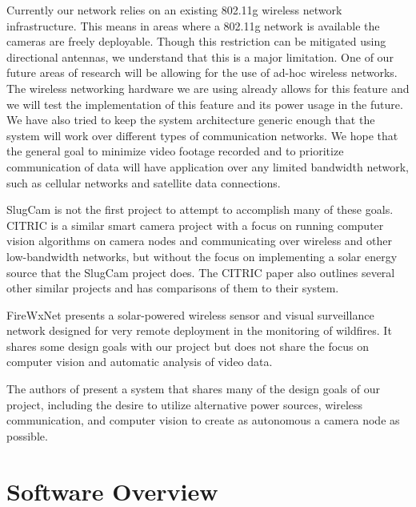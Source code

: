 Currently our network relies on an existing 802.11g wireless network
infrastructure. This means in areas where a 802.11g network is available the
cameras are freely deployable. Though this restriction can be mitigated using
directional antennas, we understand that this is a major limitation. One of our
future areas of research will be allowing for the use of ad-hoc wireless
networks. The wireless networking hardware we are using already allows for this
feature and we will test the implementation of this feature and its power usage
in the future. We have also tried to keep the system architecture generic enough
that the system will work over different types of communication networks. We
hope that the general goal to minimize video footage recorded and to prioritize
communication of data will have application over any limited bandwidth network,
such as cellular networks and satellite data connections.

SlugCam is not the first project to attempt to accomplish many of these goals.
CITRIC\cite{CITRIC} is a similar smart camera project with a focus on running
computer vision algorithms on camera nodes and communicating over wireless and
other low-bandwidth networks, but without the focus on implementing a solar
energy source that the SlugCam project does.  The CITRIC paper also outlines
several other similar projects and has comparisons of them to their system.

FireWxNet\cite{FireWxNet} presents a solar-powered wireless sensor and visual
surveillance network designed for very remote deployment in the monitoring of
wildfires. It shares some design goals with our project but does not share the
focus on computer vision and automatic analysis of video data.

The authors of \cite{10.1109/DSD.2008.23} present a system that shares many of
the design goals of our project, including the desire to utilize alternative
power sources, wireless communication, and computer vision to create as
autonomous a camera node as possible.


%
\section{Software Overview}

